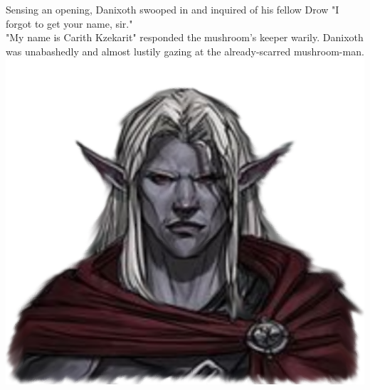 \documentclass[letterpaper,10pt,twoside,twocolumn,openany]{book}
\begin{document}
Sensing an opening, Danixoth swooped in and inquired of his fellow Drow "I forgot to get your name, sir."\\
"My name is Carith Kzekarit" responded the mushroom's keeper warily. Danixoth was unabashedly and almost lustily gazing at the already-scarred mushroom-man.\\
	{\centering
	\includegraphics[width=0.7\linewidth]{img/dist/carith.png}
	}
\end{document}

